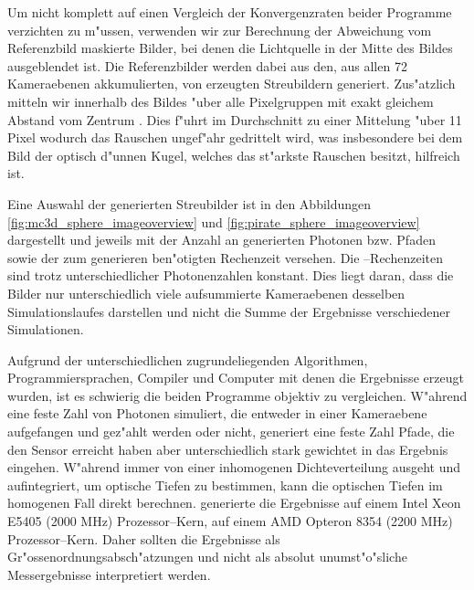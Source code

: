	Um nicht komplett auf einen Vergleich der Konvergenzraten beider Programme verzichten zu m"ussen, verwenden wir zur Berechnung der Abweichung vom Referenzbild maskierte Bilder, bei denen die Lichtquelle in der Mitte des Bildes ausgeblendet ist.	 Die Referenzbilder %
	werden dabei aus den, aus allen 72 Kameraebenen akkumulierten, von \mctd erzeugten Streubildern generiert. Zus"atzlich mitteln wir innerhalb des Bildes "uber alle Pixelgruppen mit exakt gleichem Abstand vom Zentrum%
	. Dies f"uhrt im Durchschnitt zu einer Mittelung "uber 11 Pixel wodurch das Rauschen ungef"ahr gedrittelt wird, was insbesondere bei dem Bild der optisch d"unnen Kugel, welches das st"arkste Rauschen besitzt, hilfreich ist.
	
		
	
	Eine Auswahl der generierten Streubilder ist in den Abbildungen \ref{fig:mc3d_sphere_imageoverview} und \ref{fig:pirate_sphere_imageoverview} dargestellt und jeweils mit der Anzahl an generierten Photonen bzw. Pfaden sowie der zum generieren ben"otigten Rechenzeit versehen. Die \mctd--Rechenzeiten sind trotz unterschiedlicher Photonenzahlen konstant. Dies liegt daran, dass die Bilder nur unterschiedlich viele aufsummierte Kameraebenen desselben Simulationslaufes darstellen und nicht die Summe der Ergebnisse verschiedener Simulationen.
	
	Aufgrund der unterschiedlichen zugrundeliegenden Algorithmen, Programmiersprachen, Compiler und Computer mit denen die Ergebnisse erzeugt wurden, ist es schwierig die beiden Programme objektiv zu vergleichen. W"ahrend \mctd eine feste Zahl von Photonen simuliert, die entweder in einer Kameraebene aufgefangen und gez"ahlt werden oder nicht, generiert \pirate eine feste Zahl Pfade, die den Sensor erreicht haben aber unterschiedlich stark gewichtet in das Ergebnis eingehen. W"ahrend \mctd immer von einer inhomogenen Dichteverteilung ausgeht und aufintegriert, um optische Tiefen zu bestimmen, kann \pirate die optischen Tiefen im homogenen Fall direkt berechnen. \mctd generierte die Ergebnisse auf einem Intel Xeon E5405 (2000 MHz) Prozessor--Kern, \pirate auf einem AMD Opteron 8354 (2200 MHz) Prozessor--Kern. Daher sollten die Ergebnisse als Gr"ossenordnungsabsch"atzungen und nicht als absolut unumst"o"sliche Messergebnisse interpretiert werden.
	
